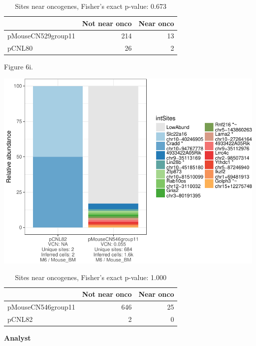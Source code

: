 \documentclass[12pt,]{article}
\begin{document}
\begin{table}[!h]

\caption{\label{tab:unnamed-chunk-3}Sites near oncogenes, Fisher's exact p-value: 0.673}
\centering
\begin{tabular}[t]{lrr}
\toprule
  & Not near onco & Near onco\\
\midrule
pMouseCN529group11 & 214 & 13\\
pCNL80 & 26 & 2\\
\bottomrule
\end{tabular}
\end{table}

\newpage

Figure 6i.

\includegraphics{project_files/figure-latex/unnamed-chunk-3-9.pdf}
\vspace{1.0cm}

\begin{table}[!h]

\caption{\label{tab:unnamed-chunk-3}Sites near oncogenes, Fisher's exact p-value: 1.000}
\centering
\begin{tabular}[t]{lrr}
\toprule
  & Not near onco & Near onco\\
\midrule
pMouseCN546group11 & 646 & 25\\
pCNL82 & 2 & 0\\
\bottomrule
\end{tabular}
\end{table}

\newpage

\newpage

\textbf{Analyst}
\end{document}
